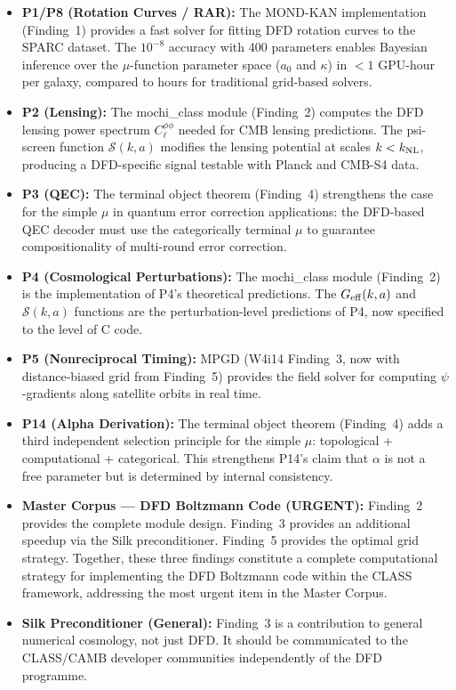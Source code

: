 \documentclass[11pt]{article}
\theoremstyle{definition}
\theoremstyle{remark}
\begin{document}
\begin{itemize}
\item \textbf{P1/P8 (Rotation Curves / RAR):} The MOND-KAN implementation
  (Finding~1) provides a fast solver for fitting DFD rotation curves to
  the SPARC dataset. The $10^{-8}$ accuracy with 400 parameters enables
  Bayesian inference over the $\mu$-function parameter space ($a_0$ and
  $\kappa$) in $< 1$ GPU-hour per galaxy, compared to hours for
  traditional grid-based solvers.

\item \textbf{P2 (Lensing):} The mochi\_class module (Finding~2) computes
  the DFD lensing power spectrum $C_\ell^{\phi\phi}$ needed for CMB
  lensing predictions. The psi-screen function $\mathcal{S}(k,a)$
  modifies the lensing potential at scales $k < k_{\rm NL}$, producing
  a DFD-specific signal testable with Planck and CMB-S4 data.

\item \textbf{P3 (QEC):} The terminal object theorem (Finding~4) strengthens
  the case for the simple $\mu$ in quantum error correction applications:
  the DFD-based QEC decoder must use the categorically terminal $\mu$ to
  guarantee compositionality of multi-round error correction.

\item \textbf{P4 (Cosmological Perturbations):} The mochi\_class module
  (Finding~2) is the implementation of P4's theoretical predictions.
  The $G_{\rm eff}(k,a)$ and $\mathcal{S}(k,a)$ functions are the
  perturbation-level predictions of P4, now specified to the level of
  C code.

\item \textbf{P5 (Nonreciprocal Timing):} MPGD (W4i14 Finding~3, now
  with distance-biased grid from Finding~5) provides the field solver
  for computing $\psi$-gradients along satellite orbits in real time.

\item \textbf{P14 (Alpha Derivation):} The terminal object theorem
  (Finding~4) adds a third independent selection principle for the
  simple $\mu$: topological + computational + categorical. This
  strengthens P14's claim that $\alpha$ is not a free parameter but
  is determined by internal consistency.

\item \textbf{Master Corpus --- DFD Boltzmann Code (URGENT):}
  Finding~2 provides the complete module design. Finding~3 provides
  an additional speedup via the Silk preconditioner. Finding~5
  provides the optimal grid strategy. Together, these three findings
  constitute a complete computational strategy for implementing the
  DFD Boltzmann code within the CLASS framework, addressing the most
  urgent item in the Master Corpus.

\item \textbf{Silk Preconditioner (General):} Finding~3 is a
  contribution to general numerical cosmology, not just DFD. It should
  be communicated to the CLASS/CAMB developer communities independently
  of the DFD programme.
\end{itemize}
\end{document}
